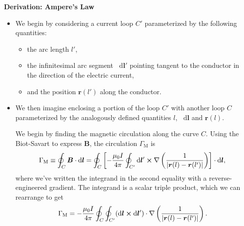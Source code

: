 \documentclass[11pt, a4paper]{article}
\newcommand{\diff}{\mathop{}\!\mathrm{d}} %
\renewcommand{\vec}[1]{\bm{#1}} %
\renewcommand{\r}{\vec{r}}
\newcommand{\B}{\vec{B}} %
\newcommand{\mm}{\mu_{0}}  %
\renewcommand{\j}{\vec{j}}  %
\renewcommand{\curl}{\nabla \cross}
\renewcommand{\grad}{\nabla}
\begin{document}
\textbf{Derivation: Ampere's Law}
\begin{itemize}
	\item We begin by considering a current loop $ C' $ parameterized by the following quantities:
    \begin{itemize}
        \item the arc length $ l' $,

        \item the infinitesimal arc segment $ \diff \vec{l}' $ pointing tangent to the conductor in the direction of the electric current,

        \item and the position $ \r(l')  $ along the conductor.
    \end{itemize}

	\item We then imagine enclosing a portion of the loop $ C' $ with another  loop $ C $ parameterized by the analogously defined quantities $ l $, $ \diff \vec{l} $ and $ \r(l) $.
	
	
	We begin by finding the magnetic circulation along the curve $ C $. Using the Biot-Savart to express $ \B $, the circulation $ \Gamma_{\text{M}} $ is
	\begin{equation*}
		\Gamma_{\text{M}} \equiv \oint_{C} \B \cdot \diff \vec{l} = \oint_{C}\left[ - \frac{\mm I}{4 \pi} \oint_{C'}\diff \vec{l}' \cross \grad \left(\frac{1}{\abs{\r(l) - \r(l')}}\right) \right] \cdot \diff \vec{l},
	\end{equation*}
	where we've written the integrand in the second equality with a reverse-engineered gradient. The integrand is a scalar triple product, which we can rearrange to get
	\begin{equation*}
		\Gamma_{\text{M}} =  - \frac{\mm I}{4\pi} \oint_{C} \oint_{C'} (\diff \vec{l} \cross \diff \vec{l}') \cdot \grad \left(\frac{1}{\abs{\r(l) - \r(l')}}\right).
	\end{equation*}
	

\end{itemize}
\end{document}
